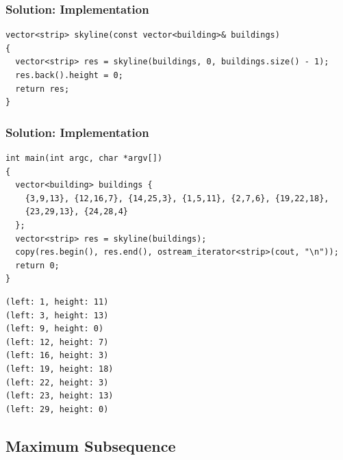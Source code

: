 \documentclass{beamer}
\begin{document}
\begin{frame}[containsverbatim]
\frametitle{Solution: Implementation}

\scriptsize
\begin{lstlisting}
vector<strip> skyline(const vector<building>& buildings)
{
  vector<strip> res = skyline(buildings, 0, buildings.size() - 1);
  res.back().height = 0;
  return res;
}
\end{lstlisting}

\end{frame}

\begin{frame}[containsverbatim]
\frametitle{Solution: Implementation}

\scriptsize
\begin{lstlisting}
int main(int argc, char *argv[])
{
  vector<building> buildings {
    {3,9,13}, {12,16,7}, {14,25,3}, {1,5,11}, {2,7,6}, {19,22,18},
    {23,29,13}, {24,28,4}
  };
  vector<strip> res = skyline(buildings);
  copy(res.begin(), res.end(), ostream_iterator<strip>(cout, "\n"));
  return 0;
}
\end{lstlisting}

\begin{verbatim}
(left: 1, height: 11)
(left: 3, height: 13)
(left: 9, height: 0)
(left: 12, height: 7)
(left: 16, height: 3)
(left: 19, height: 18)
(left: 22, height: 3)
(left: 23, height: 13)
(left: 29, height: 0)
\end{verbatim}

\end{frame}

\subsection{Maximum Subsequence}

\end{document}
